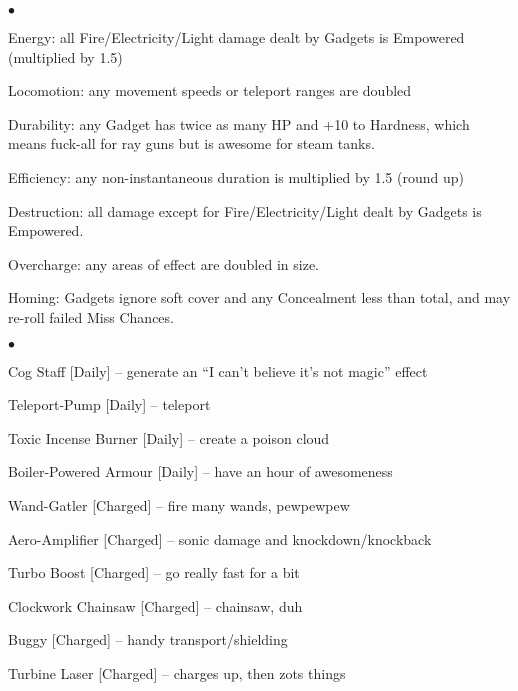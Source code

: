 \begin{list}{$\bullet$}{\itemspace}
\item Energy: all Fire/Electricity/Light damage dealt by Gadgets is Empowered (multiplied by 1.5)
\item Locomotion: any movement speeds or teleport ranges are doubled
\item Durability: any Gadget has twice as many HP and +10 to Hardness, which means fuck-all for ray guns but is awesome for steam tanks.
\item Efficiency: any non-instantaneous duration is multiplied by 1.5 (round up)
\item Destruction: all damage except for Fire/Electricity/Light dealt by Gadgets is Empowered.
\item Overcharge: any areas of effect are doubled in size.
\item Homing: Gadgets ignore soft cover and any Concealment less than total, and may re-roll failed Miss Chances.
\end{list}


\begin{list}{$\bullet$}{\itemspace}
\item Cog Staff [Daily] -- generate an ``I can't believe it's not magic'' effect
\item Teleport-Pump [Daily] -- teleport
\item Toxic Incense Burner [Daily] -- create a poison cloud
\item Boiler-Powered Armour [Daily] -- have an hour of awesomeness
\item Wand-Gatler [Charged] -- fire many wands, pewpewpew
\item Aero-Amplifier [Charged] -- sonic damage and knockdown/knockback
\item Turbo Boost [Charged] -- go really fast for a bit
\item Clockwork Chainsaw [Charged] -- chainsaw, duh
\item Buggy [Charged] -- handy transport/shielding
\item Turbine Laser [Charged] -- charges up, then zots things
\end{list}



